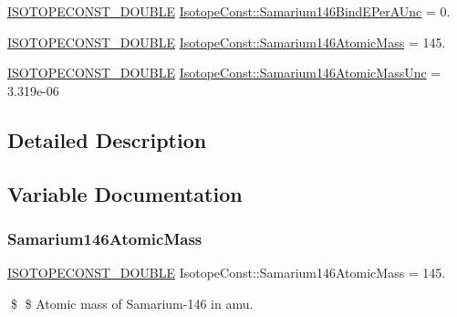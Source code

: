 \begin{DoxyCompactItemize}
\mbox{\hyperlink{group___isotope_const-_macros_ga8f45a7272ce02c0b4c65c44636ed719a}{I\+S\+O\+T\+O\+P\+E\+C\+O\+N\+S\+T\+\_\+\+D\+O\+U\+B\+LE}} \mbox{\hyperlink{group___isotope_const-_samarium-_sm146_ga483dd1949c8be0873d50e14ed82e20db}{Isotope\+Const\+::\+Samarium146\+Bind\+E\+Per\+A\+Unc}} = 0.
\item 
\mbox{\hyperlink{group___isotope_const-_macros_ga8f45a7272ce02c0b4c65c44636ed719a}{I\+S\+O\+T\+O\+P\+E\+C\+O\+N\+S\+T\+\_\+\+D\+O\+U\+B\+LE}} \mbox{\hyperlink{group___isotope_const-_samarium-_sm146_gaa00edc8dc9fd582c6fa7e8b85fbaaa49}{Isotope\+Const\+::\+Samarium146\+Atomic\+Mass}} = 145.
\item 
\mbox{\hyperlink{group___isotope_const-_macros_ga8f45a7272ce02c0b4c65c44636ed719a}{I\+S\+O\+T\+O\+P\+E\+C\+O\+N\+S\+T\+\_\+\+D\+O\+U\+B\+LE}} \mbox{\hyperlink{group___isotope_const-_samarium-_sm146_gaa019e29e968dee96a6f1e2d802a8e5a7}{Isotope\+Const\+::\+Samarium146\+Atomic\+Mass\+Unc}} = 3.\+319e-\/06
\end{DoxyCompactItemize}


\subsection{Detailed Description}


\subsection{Variable Documentation}
\mbox{\label{group___isotope_const-_samarium-_sm146_gaa00edc8dc9fd582c6fa7e8b85fbaaa49}} 
\subsubsection{\texorpdfstring{Samarium146\+Atomic\+Mass}{Samarium146AtomicMass}}
{\footnotesize\ttfamily \mbox{\hyperlink{group___isotope_const-_macros_ga8f45a7272ce02c0b4c65c44636ed719a}{I\+S\+O\+T\+O\+P\+E\+C\+O\+N\+S\+T\+\_\+\+D\+O\+U\+B\+LE}} Isotope\+Const\+::\+Samarium146\+Atomic\+Mass = 145.}

\$ \$ Atomic mass of Samarium-\/146 in amu. \mbox{\label{group___isotope_const-_samarium-_sm146_gaa019e29e968dee96a6f1e2d802a8e5a7}} 
